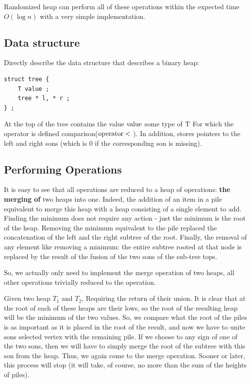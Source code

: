Randomized heap can perform all of these operations within the expected time $O (\log n)$ with a very simple implementation.

\subsection{ Data structure }

Directly describe the data structure that describes a binary heap: \begin{verbatim}
struct tree {
    T value ;
    tree * l, * r ;
} ; 
\end{verbatim}

At the top of the tree contains the value $\rm value$ some type of $\rm T$ For which the operator is defined comparison($\rm operator <$ ). In addition, stores pointers to the left and right sons (which is 0 if the corresponding son is missing).

\subsection{ Performing Operations }

It is easy to see that all operations are reduced to a heap of operations: \textbf{the merging of} two heaps into one. Indeed, the addition of an item in a pile equivalent to merge this heap with a heap consisting of a single element to add. Finding the minimum does not require any action - just the minimum is the root of the heap. Removing the minimum equivalent to the pile replaced the concatenation of the left and the right subtree of the root. Finally, the removal of any element like removing a minimum: the entire subtree rooted at that node is replaced by the result of the fusion of the two sons of the sub-tree tops.

So, we actually only need to implement the merge operation of two heaps, all other operations trivially reduced to the operation.

Given two heap $T_1$ and $T_2$, Requiring the return of their union. It is clear that at the root of each of these heaps are their lows, so the root of the resulting heap will be the minimum of the two values. So, we compare what the root of the piles is as important as it is placed in the root of the result, and now we have to unite sons selected vertex with the remaining pile. If we choose to any sign of one of the two sons, then we will have to simply merge the root of the subtree with this son from the heap. Thus, we again come to the merge operation. Sooner or later, this process will stop (it will take, of course, no more than the sum of the heights of piles).

